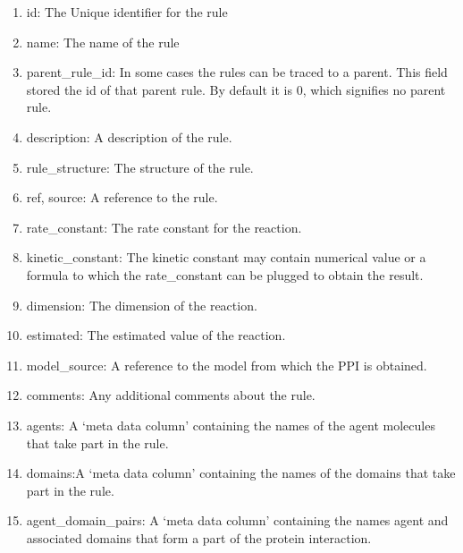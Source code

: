 \documentclass[msc,deptreport,ai]{infthesis}      %
\begin{document}
\begin{enumerate}
\begin{enumerate}
	\item id: The Unique identifier for the rule
	\item name: The name of the rule
	\item parent\_rule\_id: In some cases the rules can be traced to a parent. This field stored the id of that parent rule. By default it is 0, which signifies no parent rule.
	\item description: A description of the rule.
	\item rule\_structure: The structure of the rule. 
	\item ref, source: A reference to the rule.
	\item rate\_constant: The rate constant for the reaction.
	\item kinetic\_constant: The kinetic constant may contain numerical value or a formula to which the rate\_constant can be plugged to obtain the result.
	\item dimension: The dimension of the reaction.
	\item estimated: The estimated value of the reaction.
	\item model\_source: A reference to the model from which the PPI is obtained.
	\item comments: Any additional comments about the rule.
	\item agents: A `meta data column' containing the names of the agent molecules that take part in the rule.
	\item domains:A `meta data column' containing the names of the domains that take part in the rule.
	\item agent\_domain\_pairs:	A `meta data column' containing the names agent and associated domains that form a part of the protein interaction.
	\end{enumerate}
\end{enumerate}
\end{document}
